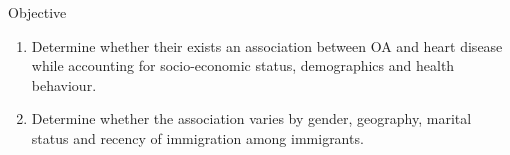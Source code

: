 \begin{frame}{Objective}
\begin{enumerate}
        \item Determine whether their exists an association between OA and heart disease while accounting for socio-economic status, demographics and health behaviour.
        \item Determine whether the association varies by gender, geography, marital status and recency of immigration among immigrants.
\end{enumerate}
\end{frame}